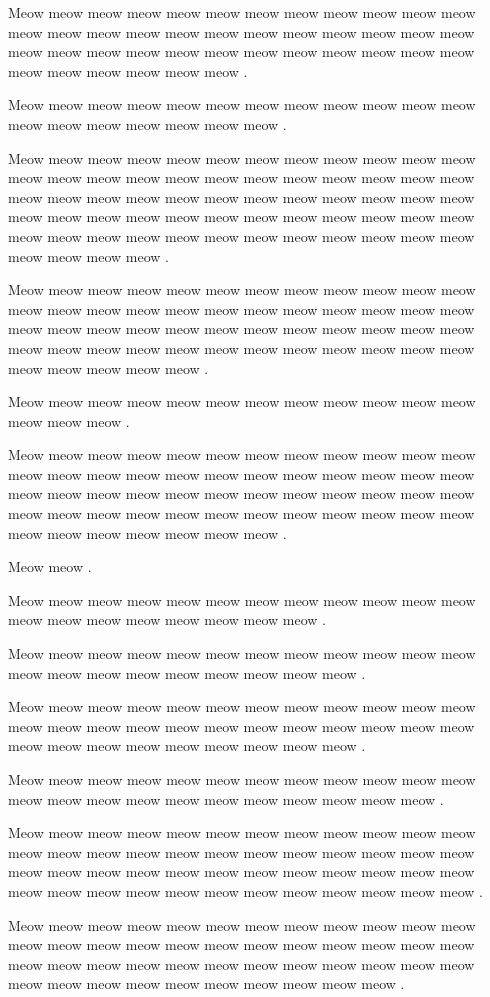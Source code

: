 \documentclass[12pt, a5paper, openany]{book}
\begin{document}
Meow meow meow meow meow meow meow meow meow meow meow meow meow meow meow meow meow meow meow meow meow meow meow meow meow meow meow meow meow meow meow meow meow meow meow meow meow meow meow meow meow meow .

Meow meow meow meow meow meow meow meow meow meow meow meow meow meow meow meow meow meow meow .

Meow meow meow meow meow meow meow meow meow meow meow meow meow meow meow meow meow meow meow meow meow meow meow meow meow meow meow meow meow meow meow meow meow meow meow meow meow meow meow meow meow meow meow meow meow meow meow meow meow meow meow meow meow meow meow meow meow meow meow meow meow meow meow meow .

Meow meow meow meow meow meow meow meow meow meow meow meow meow meow meow meow meow meow meow meow meow meow meow meow meow meow meow meow meow meow meow meow meow meow meow meow meow meow meow meow meow meow meow meow meow meow meow meow meow meow meow meow meow .

Meow meow meow meow meow meow meow meow meow meow meow meow meow meow meow .

Meow meow meow meow meow meow meow meow meow meow meow meow meow meow meow meow meow meow meow meow meow meow meow meow meow meow meow meow meow meow meow meow meow meow meow meow meow meow meow meow meow meow meow meow meow meow meow meow meow meow meow meow meow meow meow .

Meow meow .

Meow meow meow meow meow meow meow meow meow meow meow meow meow meow meow meow meow meow meow meow .

Meow meow meow meow meow meow meow meow meow meow meow meow meow meow meow meow meow meow meow meow meow .

Meow meow meow meow meow meow meow meow meow meow meow meow meow meow meow meow meow meow meow meow meow meow meow meow meow meow meow meow meow meow meow meow meow .

Meow meow meow meow meow meow meow meow meow meow meow meow meow meow meow meow meow meow meow meow meow meow meow .

Meow meow meow meow meow meow meow meow meow meow meow meow meow meow meow meow meow meow meow meow meow meow meow meow meow meow meow meow meow meow meow meow meow meow meow meow meow meow meow meow meow meow meow meow meow meow meow meow .

Meow meow meow meow meow meow meow meow meow meow meow meow meow meow meow meow meow meow meow meow meow meow meow meow meow meow meow meow meow meow meow meow meow meow meow meow meow meow meow meow meow meow meow meow meow meow .
\end{document}
